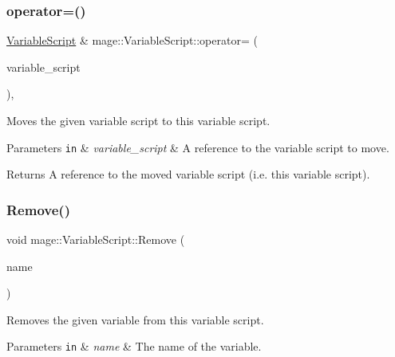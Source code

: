 \subsubsection{\texorpdfstring{operator=()}{operator=()}\hspace{0.1cm}{\footnotesize\ttfamily [2/2]}}
{\footnotesize\ttfamily \hyperlink{classmage_1_1_variable_script}{Variable\+Script} \& mage\+::\+Variable\+Script\+::operator= (\begin{DoxyParamCaption}\item[{\hyperlink{classmage_1_1_variable_script}{Variable\+Script} \&\&}]{variable\+\_\+script }\end{DoxyParamCaption})\hspace{0.3cm}{\ttfamily [default]}, {\ttfamily [noexcept]}}

Moves the given variable script to this variable script.


\begin{DoxyParams}[1]{Parameters}
\mbox{\tt in}  & {\em variable\+\_\+script} & A reference to the variable script to move. \\
\hline
\end{DoxyParams}
\begin{DoxyReturn}{Returns}
A reference to the moved variable script (i.\+e. this variable script). 
\end{DoxyReturn}
\hypertarget{classmage_1_1_variable_script_aac74a9edbe78e0caa1095ce32835501d}{}\label{classmage_1_1_variable_script_aac74a9edbe78e0caa1095ce32835501d} 
\subsubsection{\texorpdfstring{Remove()}{Remove()}}
{\footnotesize\ttfamily void mage\+::\+Variable\+Script\+::\+Remove (\begin{DoxyParamCaption}\item[{const string \&}]{name }\end{DoxyParamCaption})}

Removes the given variable from this variable script.


\begin{DoxyParams}[1]{Parameters}
\mbox{\tt in}  & {\em name} & The name of the variable. \\
\hline
\end{DoxyParams}
\hypertarget{classmage_1_1_variable_script_add51955d83e85e6d6acd82cfe40bed26}{}\label{classmage_1_1_variable_script_add51955d83e85e6d6acd82cfe40bed26} 
